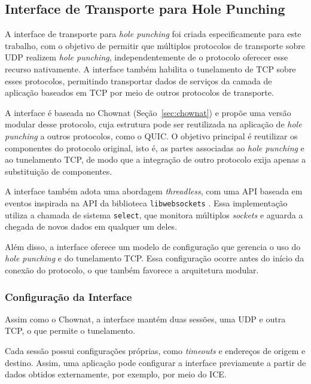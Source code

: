 \subsection{Interface de Transporte para Hole Punching}
\label{sec:hole_punching_interface}

A interface de transporte para \textit{hole punching} foi criada especificamente para este trabalho, com o objetivo de permitir que múltiplos protocolos de transporte sobre UDP realizem \textit{hole punching}, independentemente de o protocolo oferecer esse recurso nativamente. A interface também habilita o tunelamento de TCP sobre esses protocolos, permitindo transportar dados de serviços da camada de aplicação baseados em TCP por meio de outros protocolos de transporte.

A interface é baseada no Chownat (Seção~\ref{sec:chownat}) e propõe uma versão modular desse protocolo, cuja estrutura pode ser reutilizada na aplicação de \textit{hole punching} a outros protocolos, como o QUIC. O objetivo principal é reutilizar os componentes do protocolo original, isto é, as partes associadas ao \textit{hole punching} e ao tunelamento TCP, de modo que a integração de outro protocolo exija apenas a substituição de componentes.

A interface também adota uma abordagem \textit{threadless}, com uma API baseada em eventos inspirada na API da biblioteca \texttt{libwebsockets} \citep{libwebsockets}. Essa implementação utiliza a chamada de sistema \texttt{select}, que monitora múltiplos \textit{sockets} e aguarda a chegada de novos dados em qualquer um deles.

Além disso, a interface oferece um modelo de configuração que gerencia o uso do \textit{hole punching} e do tunelamento TCP. Essa configuração ocorre antes do início da conexão do protocolo, o que também favorece a arquitetura modular.

\subsubsection{Configuração da Interface}

Assim como o Chownat, a interface mantém duas sessões, uma UDP e outra TCP, o que permite o tunelamento.

Cada sessão possui configurações próprias, como \textit{timeouts} e endereços de origem e destino. Assim, uma aplicação pode configurar a interface previamente a partir de dados obtidos externamente, por exemplo, por meio do ICE.

